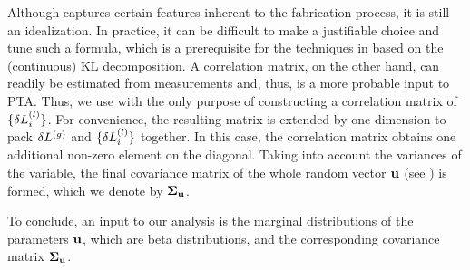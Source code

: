 Although  captures certain features inherent to the fabrication process, it is still an idealization.
In practice, it can be difficult to make a justifiable choice and tune such a formula, which is a prerequisite for the techniques in  based on the (continuous) KL decomposition.
A correlation matrix, on the other hand, can readily be estimated from measurements and, thus, is a more probable input to PTA.
Thus, we use  with the only purpose of constructing a correlation matrix of $\{ \delta L^{(l)}_i \}$.
For convenience, the resulting matrix is extended by one dimension to pack ${\delta L^{(g)}}$ and $\{ \delta L^{(l)}_i \}$ together.
In this case, the correlation matrix obtains one additional non-zero element on the diagonal.
Taking into account the variances of the variable, the final covariance matrix of the whole random vector $\mathbf{u}$ (see ) is formed, which we denote by $\mCov_\vU$.

To conclude, an input to our analysis is the marginal distributions of the parameters $\mathbf{u}$, which are beta distributions, and the corresponding covariance matrix $\mCov_\vU$.
